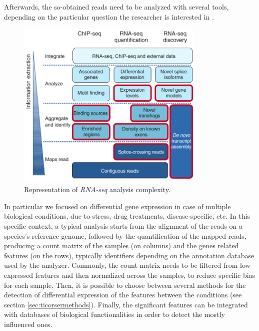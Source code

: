 Afterwards, the so-obtained reads need to be analyzed with several tools, depending on the particular question the researcher is interested in \cite{Pepke2009, Oshlack2010}.

\begin{figure}[h]
\centering
\includegraphics[width=9cm, keepaspectratio]{img/intro/rna-seqan.png}
\caption[RNA-seq analysis]{Representation of \textit{RNA-seq} analysis complexity. \cite{Pepke2009}}
\label{fig:rnaseqan}
\end{figure}


In particular we focused on differential gene expression in case of multiple biological conditions, due to stress, drug treatments, disease-specific, etc. In this specific context, a typical analysis starts from the alignment of the reads on a species's reference genome, followed by the quantification of the mapped reads, producing a count matrix of the samples (on columns) and the genes related features (on the rows), typically identifiers depending on the annotation database used by the analyzer.
Commonly, the count matrix needs to be filtered from low expressed features and then normalized across the samples, to reduce specific bias for each sample.
Then, it is possible to choose between several methods for the detection of differential expression of the features between the conditions (see section \ref{sec:ticorsermethods}).
Finally, the significant features can be integrated with databases of biological functionalities in order to detect the mostly influenced ones.

